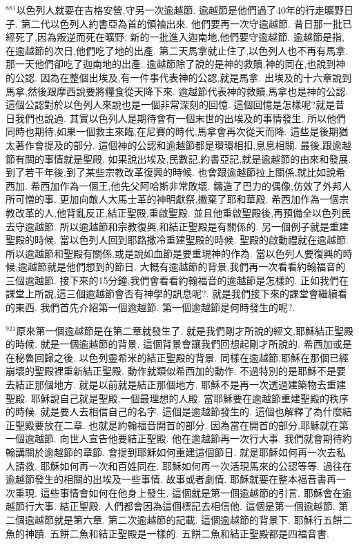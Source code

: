 \documentclass{book}
\begin{document}
$^{881}$以色列人就要在吉格安營,守另一次逾越節.
逾越節是他們過了40年的行走曠野日子.
第二代以色列人約書亞為首的領袖出來.
他們要再一次守逾越節.
昔日那一批已經死了,因為叛逆而死在曠野.
新的一批進入迦南地,他們要守逾越節.
逾越節是指,在逾越節的次日,他們吃了地的出產.
第二天馬拿就止住了,以色列人也不再有馬拿.
那一天他們卻吃了迦南地的出產.
逾越節除了說的是神的救贖,神的同在,也說到神的公認.
因為在整個出埃及,有一件事代表神的公認,就是馬拿.
出埃及的十六章說到馬拿,然後跟摩西說要將糧食從天降下來.
逾越節代表神的救贖,馬拿也是神的公認.
這個公認對於以色列人來說也是一個非常深刻的回憶.
這個回憶是怎樣呢?就是昔日我們也說過.
其實以色列人是期待會有一個末世的出埃及的事情發生.
所以他們同時也期待,如果一個救主來臨,在尼賽的時代,馬拿會再次從天而降.
這些是後期猶太著作會提及的部分.
這個神的公認和逾越節都是環環相扣,息息相關.
最後,跟逾越節有關的事情就是聖殿.
如果說出埃及,民數記,約書亞記,就是逾越節的由來和發展.
到了若干年後,到了某些宗教改革復興的時候.
也會跟逾越節拉上關係,就比如說希西加.
希西加作為一個王,他先父阿哈斯非常敗壞.
鑄造了巴力的偶像,仿效了外邦人所可憎的事.
更加向敵人大馬士革的神明獻祭,撇棄了耶和華殿.
希西加作為一個宗教改革的人,他背亂反正,結正聖殿,重啟聖殿.
並且他重啟聖殿後,再預備全以色列民去守逾越節.
所以逾越節和宗教復興,和結正聖殿是有關係的.
另一個例子就是重建聖殿的時候.
當以色列人回到耶路撒冷重建聖殿的時候.
聖殿的啟動禮就在逾越節.
所以逾越節和聖殿有關係,或是說如血節是要重現神的作為.
當以色列人要復興的時候,逾越節就是他們想到的節日.
大概有逾越節的背景,我們再一次看看約翰福音的三個逾越節.
接下來的15分鐘,我們會看看約翰福音的逾越節是怎樣的.
正如我們在課堂上所說,這三個逾越節會否有神學的訊息呢?.
就是我們接下來的課堂會繼續看的東西.
我們首先介紹第一個逾越節.
第一個逾越節是何時發生的呢?.

$^{921}$原來第一個逾越節是在第二章就發生了.
就是我們剛才所說的經文,耶穌結正聖殿的時候.
就是一個逾越節的背景.
這個背景會讓我們回想起剛才所說的.
希西加或是在秘魯回歸之後.
以色列靈希米的結正聖殿的背景.
同樣在逾越節,耶穌在那個已經崩壞的聖殿裡重新結正聖殿.
動作就類似希西加的動作.
不過特別的是耶穌不是要去結正那個地方.
就是以前就是結正那個地方.
耶穌不是再一次透過建築物去重建聖殿.
耶穌說自己就是聖殿,一個最理想的人殿.
當耶穌要在逾越節重建聖殿的秩序的時候.
就是要人去相信自己的名字.
這個是逾越節發生的.
這個也解釋了為什麼結正聖殿要放在二章.
也就是約翰福音開首的部分.
因為當在開首的部分,耶穌就在第一個逾越節.
向世人宣告他要結正聖殿.
他在逾越節再一次行大事.
我們就會期待約翰講關於逾越節的章節.
會提到耶穌如何重建這個節日.
就是耶穌如何再一次去私人請救.
耶穌如何再一次和百姓同在.
耶穌如何再一次活現馬來的公認等等.
過往在逾越節發生的相關的出埃及一些事情.
故事或者劇情.
耶穌就要在整本福音書再一次重現.
這些事情會如何在他身上發生.
這個就是第一個逾越節的引言.
耶穌會在逾越節行大事.
結正聖殿.
人們都會因為這個標記去相信他.
這個是第一個逾越節.
第二個逾越節就是第六章.
第二次逾越節的記載.
這個逾越節的背景下.
耶穌行五餅二魚的神蹟.
五餅二魚和結正聖殿是一樣的.
五餅二魚和結正聖殿都是四福音書.
\end{document}
